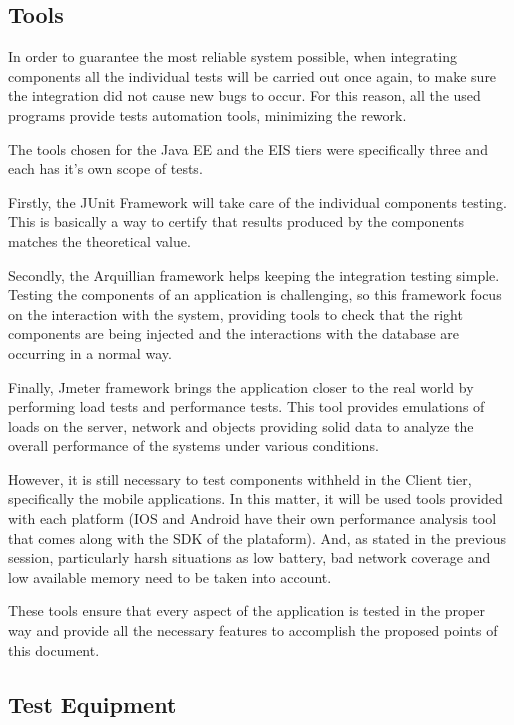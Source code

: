 \documentclass[a4paper]{article}
\begin{document}
\subsection{Tools}

In order to guarantee the most reliable system possible, when integrating components all the individual tests will be carried out once again, to make sure the integration did not cause new bugs to occur. For this reason, all the used programs provide tests automation tools, minimizing the rework. 

The tools chosen for the Java EE and the EIS tiers were specifically three and each has it’s own scope of tests.

Firstly,  the JUnit Framework will take care of the individual components testing. This is basically a way to certify that results produced by the components matches the theoretical value.

Secondly, the Arquillian framework helps keeping the integration testing simple. Testing the components of an application is challenging, so this framework focus on the interaction with the system, providing tools to check that the right components are being injected and the interactions with the database are occurring in a normal way. 

Finally, Jmeter framework brings the application closer to the real world by performing load tests and performance tests. This tool provides emulations of loads on the server, network and objects providing solid data to analyze the overall performance of the systems under various conditions.

However, it is still necessary to  test components withheld in the Client tier,  specifically the mobile applications. In this matter, it will be used tools provided with each platform (IOS and Android have their own performance analysis tool that comes along with the SDK of the plataform). And, as stated in the previous session, particularly harsh situations as low battery, bad network coverage and low available memory need to be taken into account. 

These tools ensure that every aspect of the application is tested in the proper way and provide all the necessary features to accomplish the proposed points of this document.

\subsection{Test Equipment}
\end{document}
